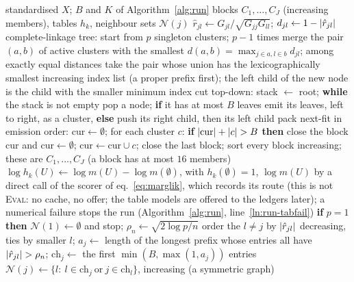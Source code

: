 \begin{algorithm}
\caption{Stage~2: blocks, block tables and the neighbour graph.}\label{alg:blocks}
{\footnotesize
\begin{algorithmic}[1]
\Require standardised $X$; $B$ and $K$ of Algorithm~\ref{alg:run}
\Ensure blocks $C_1,\dots,C_J$ (increasing members), tables $h_k$, neighbour sets $\mathcal N(j)$
\State $\hat r_{jl}\gets G_{jl}/\sqrt{G_{jj}G_{ll}}$; $d_{jl}\gets1-\lvert \hat r_{jl}\rvert$ %
\State complete-linkage tree: start from $p$ singleton clusters; $p-1$ times merge the pair $(a,b)$ of active clusters with the smallest $d(a,b)=\max_{j\in a,l\in b}d_{jl}$; among exactly equal distances take the pair whose union has the lexicographically smallest increasing index list (a proper prefix first); the left child of the new node is the child with the smaller minimum index %
\State cut top-down: stack $\gets$ root; \textbf{while} the stack is not empty pop a node; \textbf{if} it has at most $B$ leaves emit its leaves, left to right, as a cluster, \textbf{else} push its right child, then its left child %
\State pack next-fit in emission order: $\mathrm{cur}\gets\emptyset$; for each cluster $c$: \textbf{if} $\lvert \mathrm{cur}\rvert+\lvert c\rvert>B$ \textbf{then} close the block $\mathrm{cur}$ and $\mathrm{cur}\gets\emptyset$; $\mathrm{cur}\gets\mathrm{cur}\cup c$; close the last block; sort every block increasing; these are $C_1,\dots,C_J$ (a block has at most $16$ members) %
\EndProcedure
{}
\State $\log h_k(U)\gets\log m(U)-\log m(\emptyset)$, with $h_k(\emptyset)=1$, $\log m(U)$ by a direct call of the scorer of eq.~\eqref{eq:marglik}, which records its route (this is not \textsc{Eval}: no cache, no offer; the table models are offered to the ledgers later); a numerical failure stops the run (Algorithm~\ref{alg:run}, line~\ref{ln:run-tabfail}) %
\EndFor
\EndProcedure
{}
\State \textbf{if} $p=1$ \textbf{then} $\mathcal N(1)\gets\emptyset$ and stop; $\rho_n\gets\sqrt{2\log p/n}$ %
\State order the $l\ne j$ by $\lvert \hat r_{jl}\rvert$ decreasing, ties by smaller $l$; $a_j\gets$ length of the longest prefix whose entries all have $\lvert \hat r_{jl}\rvert>\rho_n$; $\mathrm{ch}_j\gets$ the first $\min(B,\max(1,a_j))$ entries %
\EndFor
\State $\mathcal N(j)\gets\{l:\ l\in\mathrm{ch}_j\ \text{or}\ j\in\mathrm{ch}_l\}$, increasing (a symmetric graph) %
\EndProcedure
\end{algorithmic}}
\end{algorithm}

